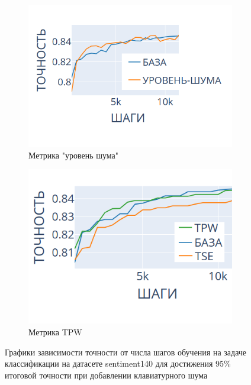 \documentclass{spbau-diploma}
\begin{document}
\begin{figure}[h]
	\centering
	\begin{subfigure}{.45\textwidth}
		\centering
		\includegraphics[scale=0.5]{keyboard_noise_level_short_prefix}
		\caption{Метрика "уровень шума"}
		\label{fig:s140_noise_lvl}
	\end{subfigure}
	\begin{subfigure}{.45\textwidth}
		\centering
		\includegraphics[scale=0.5]{keyboard_noise_TPW_win}
		\caption{Метрика TPW}
		\label{fig:s140_noise_tpw}
	\end{subfigure}
	\caption{Графики зависимости точности от числа шагов обучения на задаче классификации на датасете sentiment140 для достижения 95\% итоговой точности при добавлении клавиатурного шума}
	\label{fig:s140_noise}
\end{figure}

\pagebreak
\end{document}
